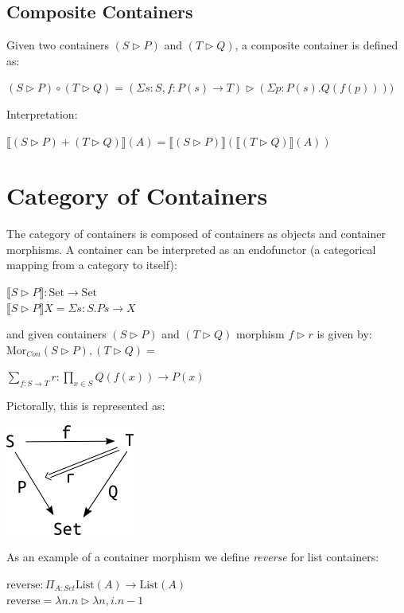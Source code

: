 \documentclass[12pt]{report}
\begin{document}
\subsection*{Composite Containers}
Given two containers $(S \rhd P)$ and $ (T \rhd Q)$, a composite container is defined as:
\begin{center}
$(S \rhd P) \circ (T \rhd Q) = (\Sigma s:S,f:P(s) \to T) \rhd (\Sigma p:P(s).Q(f(p))))$
\end{center}
Interpretation:
\begin{center}
$\llbracket (S \rhd P) + (T \rhd Q) \rrbracket (A)= \llbracket(S \rhd P) \rrbracket (\llbracket (T \rhd Q) \rrbracket (A))$
\end{center}

\section{Category of Containers}
The category of containers is composed of containers as objects and container morphisms.
A container can be interpreted as an endofunctor (a categorical mapping from a category to itself):
\begin{center}
$\llbracket S \rhd P\rrbracket : \text{Set} \to \text{Set}$\\
$ \llbracket S \rhd P\rrbracket X = \Sigma s : S. P s \to X $
\end{center}
and given containers $ (S \rhd P)$ and $ (T \rhd Q)$ morphism $ f \rhd r $ is given by:
\linebreak
\linebreak
$\text{Mor}_{Con}(S \rhd P),(T \rhd Q) = $
\begin{center}
$ \sum_{f : S \to T} r : \prod_{x \in S} Q(f(x)) \to P(x)$
\end{center}
Pictorally, this is represented as:
\begin{center}
\includegraphics[scale=1]{conmor.png}
\end{center}
As an example of a container morphism we define \textit{reverse} for list containers:
\begin{center}
$\text{reverse}:\Pi_{A:Set} \text{List}(A) \to \text{List}(A)$\\
$\text{reverse} = \lambda n.n \rhd \lambda n,i.n-1$
\end{center}
\end{document}
